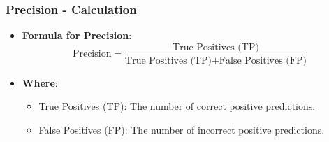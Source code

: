 \documentclass[aspectratio=169]{beamer}
\begin{document}
\begin{frame}[fragile]
    \frametitle{Precision - Calculation}
    \begin{itemize}
        \item \textbf{Formula for Precision}:
        \begin{equation} 
            \text{Precision} = \frac{\text{True Positives (TP)}}{\text{True Positives (TP)} + \text{False Positives (FP)}}
        \end{equation}
        \item \textbf{Where}:
        \begin{itemize}
            \item True Positives (TP): The number of correct positive predictions.
            \item False Positives (FP): The number of incorrect positive predictions.
        \end{itemize}
    \end{itemize}
\end{frame}
\end{document}
